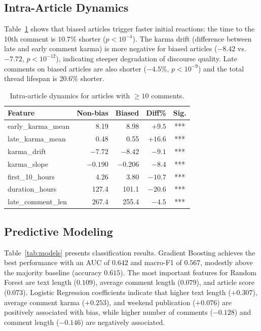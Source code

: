 \subsection{Intra-Article Dynamics}

Table~\ref{tab:dynamics} shows that biased articles trigger faster initial reactions: the time to the 10th comment is $10.7\%$ shorter ($p < 10^{-4}$).
The karma drift (difference between late and early comment karma) is more negative for biased articles ($-8.42$ vs.\ $-7.72$, $p < 10^{-12}$), indicating steeper degradation of discourse quality.
Late comments on biased articles are also shorter ($-4.5\%$, $p < 10^{-9}$) and the total thread lifespan is 20.6\% shorter.

\begin{table}[t]
\centering
\small
\begin{tabular}{lrrrc}
\toprule
\textbf{Feature} & \textbf{Non-bias} & \textbf{Biased} & \textbf{Diff\%} & \textbf{Sig.} \\
\midrule
early\_karma\_mean & 8.19 & 8.98 & $+9.5$ & *** \\
late\_karma\_mean & 0.48 & 0.55 & $+16.6$ & *** \\
karma\_drift & $-7.72$ & $-8.42$ & $-9.1$ & *** \\
karma\_slope & $-0.190$ & $-0.206$ & $-8.4$ & *** \\
first\_10\_hours & 4.26 & 3.80 & $-10.7$ & *** \\
duration\_hours & 127.4 & 101.1 & $-20.6$ & *** \\
late\_comment\_len & 267.4 & 255.4 & $-4.5$ & *** \\
\bottomrule
\end{tabular}
\caption{Intra-article dynamics for articles with $\geq 10$ comments.}
\label{tab:dynamics}
\end{table}

\subsection{Predictive Modeling}

Table~\ref{tab:models} presents classification results.
Gradient Boosting achieves the best performance with an AUC of $0.642$ and macro-F1 of $0.567$, modestly above the majority baseline (accuracy $0.615$).
The most important features for Random Forest are text length ($0.109$), average comment length ($0.079$), and article score ($0.073$).
Logistic Regression coefficients indicate that higher text length ($+0.307$), average comment karma ($+0.253$), and weekend publication ($+0.076$) are positively associated with bias, while higher number of comments ($-0.128$) and comment length ($-0.146$) are negatively associated.

